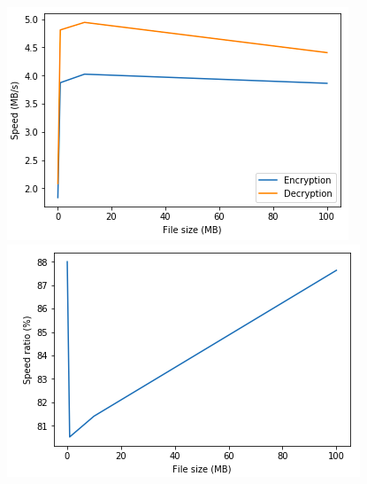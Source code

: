 \documentclass[11pt]{article}
\begin{document}
\begin{center}
\includegraphics[scale=0.45]{./enc_dec_speed_blowfish_cbc.png}
\includegraphics[scale=0.45]{./avg_speed_ratio_blowfish_cbc.png}
\end{center}
\end{document}
